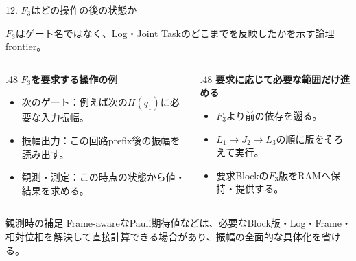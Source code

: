 \documentclass[aspectratio=169,10pt,hyperref={unicode,hidelinks}]{beamer}
\newcommand{\smallnote}[1]{\par{\footnotesize\color{muted}#1\par}}
\begin{document}
\begin{frame}{12. $F_3$はどの操作の後の状態か}
  \smallnote{$F_3$はゲート名ではなく、Log・Joint Taskのどこまでを反映したかを示す論理frontier。}
  \begin{center}
  \end{center}
  \begin{columns}[T,onlytextwidth]
    \begin{column}{.48\textwidth}
      \textbf{$F_3$を要求する操作の例}
      \footnotesize
      \begin{itemize}
        \setlength{\itemsep}{3pt}
        \item 次のゲート：例えば次の$H(q_1)$に必要な入力振幅。
        \item 振幅出力：この回路prefix後の振幅を読み出す。
        \item 観測・測定：この時点の状態から値・結果を求める。
      \end{itemize}
    \end{column}
    \begin{column}{.48\textwidth}
      \textbf{要求に応じて必要な範囲だけ進める}
      \footnotesize
      \begin{itemize}
        \setlength{\itemsep}{3pt}
        \item $F_3$より前の依存を遡る。
        \item $L_1\to J_2\to L_3$の順に版をそろえて実行。
        \item 要求Blockの$F_3$版をRAMへ保持・提供する。
      \end{itemize}
    \end{column}
  \end{columns}
  \small
  \begin{block}{観測時の補足}
    Frame-awareなPauli期待値などは、必要なBlock版・Log・Frame・相対位相を解決して直接計算できる場合があり、振幅の全面的な具体化を省ける。

\end{block}
\end{frame}
\end{document}
